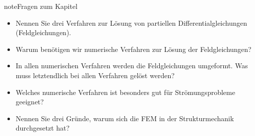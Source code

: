 \documentclass[letterpaper,10pt,german]{jupyterBook}
\begin{document}
\begin{sphinxadmonition}{note}{Fragen zum Kapitel}

\sphinxAtStartPar
{}
\begin{itemize}
\item {} 
\sphinxAtStartPar
Nennen Sie drei Verfahren zur Lösung von partiellen Differentialgleichungen (Feldgleichungen).

\item {} 
\sphinxAtStartPar
Warum benötigen wir numerische Verfahren zur Lösung der Feldgleichungen?

\item {} 
\sphinxAtStartPar
In allen numerischen Verfahren werden die Feldgleichungen umgeformt. Was muss letztendlich bei allen Verfahren gelöst werden?

\item {} 
\sphinxAtStartPar
Welches numerische Verfahren ist besonders gut für Strömungsprobleme geeignet?

\item {} 
\sphinxAtStartPar
Nennen Sie drei Gründe, warum sich die FEM in der Strukturmechanik durchgesetzt hat?

\end{itemize}
\end{sphinxadmonition}

\sphinxstepscope
\end{document}
